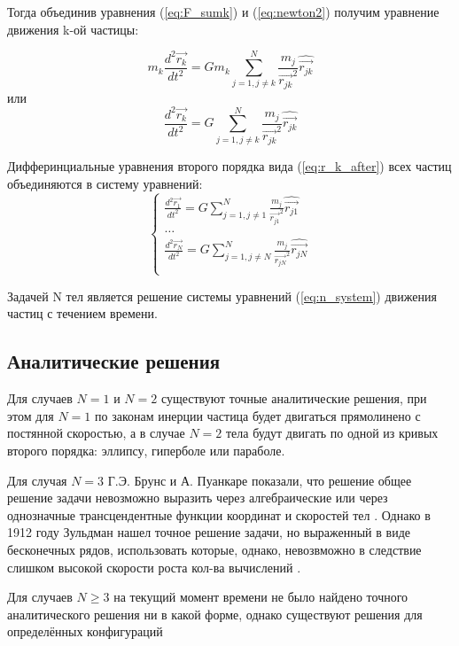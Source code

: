 Тогда объединив уравнения (\ref{eq:F_sumk}) и (\ref{eq:newton2}) получим уравнение движения k-ой частицы:
 
 \begin{equation}
 	\label{eq:r_k_before}
 	m_k\frac{d^2\vec{r_k}}{dt^2} = Gm_k\sum_{j=1, j \neq k}^{N}{\frac{m_j}{\vec{r_{jk}}^2}\hat{\vec{r_{jk}}}}
 \end{equation}
 или
 \begin{equation}
 	\label{eq:r_k_after}
 	\frac{d^2\vec{r_k}}{dt^2} = G\sum_{j=1, j \neq k}^{N}{\frac{m_j}{\vec{r_{jk}}^2}\hat{\vec{r_{jk}}}}
 \end{equation}
 
 Дифферинциальные уравнения второго порядка вида (\ref{eq:r_k_after}) всех частиц объединяются в систему уравнений:
  \begin{equation}
 	\label{eq:n_system}
 	\begin{cases}
 		\frac{d^2\vec{r_1}}{dt^2} = G\sum_{j=1, j \neq 1}^{N}{\frac{m_j}{\vec{r_{j1}}^2}\hat{\vec{r_{j1}}}} \\
 		\dots \\
 		\frac{d^2\vec{r_N}}{dt^2} = G\sum_{j=1, j \neq N}^{N}{\frac{m_j}{\vec{r_{jN}}^2}\hat{\vec{r_{jN}}}} \\
 	\end{cases}
 \end{equation}

Задачей N тел является решение системы уравнений (\ref{eq:n_system}) движения частиц с течением времени.
\subsection{Аналитические решения}
Для случаев $N = 1$ и $N = 2$ существуют точные аналитические решения, при этом для $N = 1$ по законам инерции частица будет двигаться прямолинено с постянной скоростью, а в случае $N = 2$ тела будут двигать по одной из кривых второго порядка: эллипсу, гиперболе или параболе.

Для случая $N = 3$ Г.Э. Брунс и А. Пуанкаре показали, что решение общее решение задачи невозможно выразить через алгебраические или через однозначные трансцендентные функции координат и скоростей тел \cite{markeev}. Однако в 1912 году Зульдман нашел точное решение задачи, но выраженный в виде бесконечных рядов, использовать которые, однако, невозвможно в следствие слишком высокой скорости роста кол-ва вычислений \cite{markeev}.

Для случаев $N \geq 3$ на текущий момент времени не было найдено точного аналитического решения ни в какой форме, однако существуют решения для определённых конфигураций
